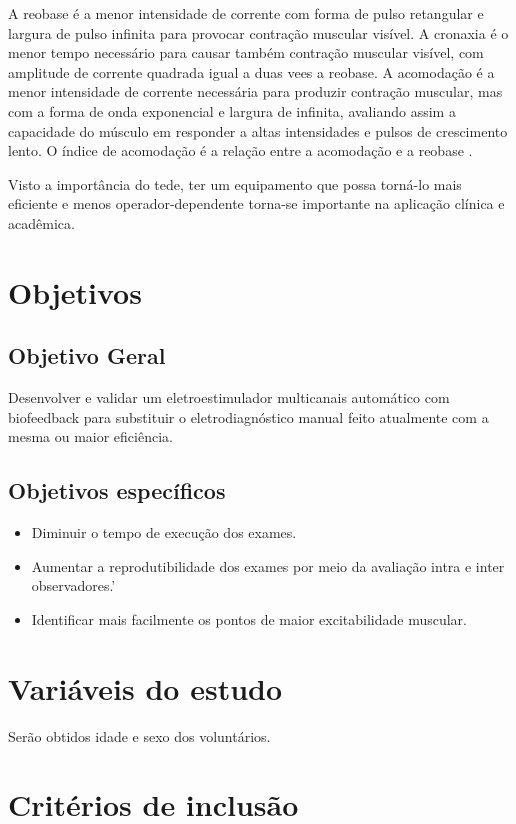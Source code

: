 \documentclass[a4paper,10pt]{article}
\begin{document}
A reobase é a menor intensidade de corrente com forma de pulso retangular e largura de pulso infinita para provocar contração muscular visível. A cronaxia é o menor tempo necessário para causar também contração muscular visível, com amplitude de corrente quadrada igual a duas vees a reobase. A acomodação é a menor intensidade de corrente necessária para produzir contração muscular, mas com a forma de onda exponencial e largura de infinita, avaliando assim a capacidade do músculo em responder a altas intensidades e pulsos de crescimento lento. O índice de acomodação é a relação entre a acomodação e a reobase \cite{sluga2002}.

Visto a importância do \ac{tede}, ter um equipamento que possa torná-lo mais eficiente e menos operador-dependente torna-se importante na aplicação clínica e acadêmica.

\section{Objetivos}

\subsection{Objetivo Geral}
Desenvolver e validar um eletroestimulador multicanais automático com biofeedback para  substituir o eletrodiagnóstico manual feito atualmente com a mesma ou maior eficiência.
\subsection{Objetivos específicos}
\begin{itemize}
  \item Diminuir o tempo de execução dos exames.
  \item Aumentar a reprodutibilidade dos exames por meio da avaliação intra e inter observadores.’
  \item Identificar mais facilmente os pontos de maior excitabilidade muscular.
\end{itemize}

\section{Variáveis do estudo}
Serão obtidos idade e sexo dos voluntários.

\section{Critérios de inclusão}
\end{document}
